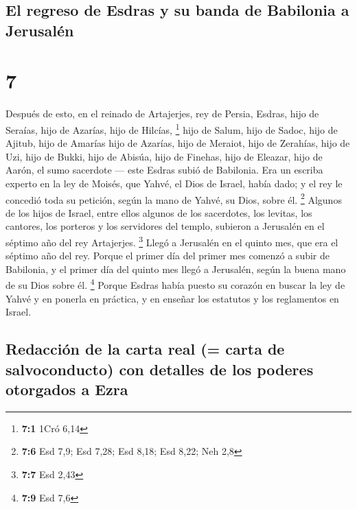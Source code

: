 \hypertarget{el-regreso-de-esdras-y-su-banda-de-babilonia-a-jerusaluxe9n}{%
\subsection{El regreso de Esdras y su banda de Babilonia a
Jerusalén}\label{el-regreso-de-esdras-y-su-banda-de-babilonia-a-jerusaluxe9n}}

\hypertarget{section-6}{%
\section{7}\label{section-6}}

 Después de esto, en el reinado de Artajerjes, rey de
Persia, Esdras, hijo de Seraías, hijo de Azarías, hijo de Hilcías,
\footnote{\textbf{7:1} 1Cró 6,14}  hijo de Salum, hijo de
Sadoc, hijo de Ajitub,  hijo de Amarías hijo de Azarías,
hijo de Meraiot,  hijo de Zerahías, hijo de Uzi, hijo de
Bukki,  hijo de Abisúa, hijo de Finehas, hijo de Eleazar,
hijo de Aarón, el sumo sacerdote ---  este Esdras subió de
Babilonia. Era un escriba experto en la ley de Moisés, que Yahvé, el
Dios de Israel, había dado; y el rey le concedió toda su petición, según
la mano de Yahvé, su Dios, sobre él. \footnote{\textbf{7:6} Esd 7,9; Esd
  7,28; Esd 8,18; Esd 8,22; Neh 2,8}  Algunos de los hijos
de Israel, entre ellos algunos de los sacerdotes, los levitas, los
cantores, los porteros y los servidores del templo, subieron a Jerusalén
en el séptimo año del rey Artajerjes. \footnote{\textbf{7:7} Esd 2,43}
 Llegó a Jerusalén en el quinto mes, que era el séptimo
año del rey.  Porque el primer día del primer mes comenzó
a subir de Babilonia, y el primer día del quinto mes llegó a Jerusalén,
según la buena mano de su Dios sobre él. \footnote{\textbf{7:9} Esd 7,6}
 Porque Esdras había puesto su corazón en buscar la ley
de Yahvé y en ponerla en práctica, y en enseñar los estatutos y los
reglamentos en Israel.

\hypertarget{redacciuxf3n-de-la-carta-real-carta-de-salvoconducto-con-detalles-de-los-poderes-otorgados-a-ezra}{%
\subsection{Redacción de la carta real (= carta de salvoconducto) con
detalles de los poderes otorgados a
Ezra}\label{redacciuxf3n-de-la-carta-real-carta-de-salvoconducto-con-detalles-de-los-poderes-otorgados-a-ezra}}

